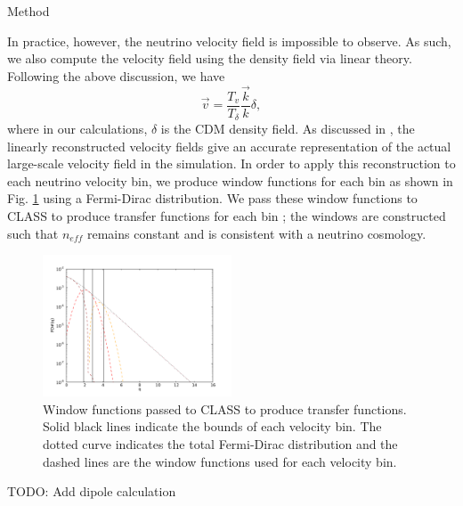 \begin{section}{Method}
\par In practice, however, the neutrino velocity field is 
impossible to observe. As such, we also compute the velocity 
field using the density field via linear theory. Following 
the above discussion, we have
\begin{equation}
   \vec{v} = \frac{T_{v}}{T_{\delta}}\frac{\vec{k}}{k}\delta,
\end{equation}
where in our calculations, $\delta$ is the CDM density field. 
As discussed in \cite{bib:Inman}, the linearly reconstructed velocity fields 
give an accurate representation of the actual large-scale velocity 
field in the simulation. In order to apply this reconstruction 
to each neutrino velocity bin, we produce window functions for
each bin as shown in Fig. \ref{fig:fdwindow} using a Fermi-Dirac
distribution. We pass these window functions to CLASS to
produce transfer functions for each bin \cite{bib:Blas}; the 
windows are constructed such that $n_{eff}$ remains constant 
and is consistent with a neutrino cosmology.

\begin{figure}[tbp]
  \begin{center}
    \includegraphics[width=0.5\textwidth]{./figures/fdwindow.pdf}
    \caption{Window functions passed to CLASS to produce transfer functions.
	     Solid black lines indicate the bounds of each velocity bin. The dotted
	     curve indicates the total Fermi-Dirac distribution and the dashed lines
	     are the window functions used for each velocity bin.}
    \label{fig:fdwindow}
  \end{center}
\end{figure}
   

TODO: Add dipole calculation

\end{section}
